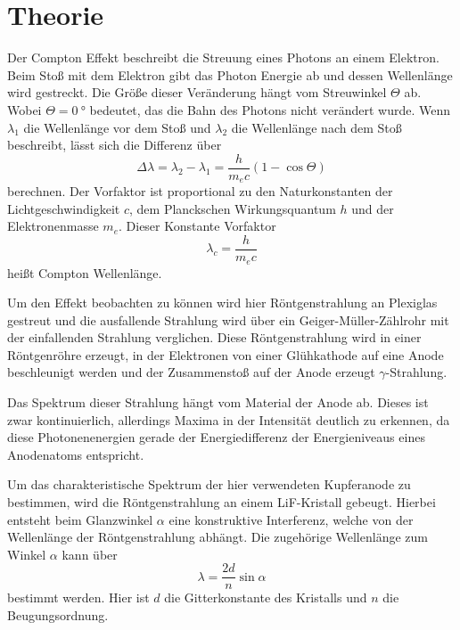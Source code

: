 \section{Theorie}
\label{sec:Theorie}




Der Compton Effekt beschreibt die Streuung eines Photons an einem Elektron.
Beim Stoß mit dem Elektron gibt das Photon Energie ab und dessen Wellenlänge wird gestreckt.
Die Größe dieser Veränderung hängt vom Streuwinkel $\Theta$ ab. 
Wobei $\Theta=\SI{0}{\degree}$ bedeutet, das die Bahn des Photons nicht verändert wurde.
Wenn $\lambda_1$ die Wellenlänge vor dem Stoß und $\lambda_2$ die Wellenlänge nach dem Stoß beschreibt, lässt sich die Differenz über
\begin{equation}
    \Delta \lambda = \lambda_2 - \lambda_1 = \frac{h}{m_e c}(1-\cos \Theta)
    \label{eq:differenz}
\end{equation}
berechnen.
Der Vorfaktor ist proportional zu den Naturkonstanten der Lichtgeschwindigkeit $c$, dem Planckschen Wirkungsquantum $h$ und der Elektronenmasse $m_e$.
Dieser Konstante Vorfaktor 
\begin{equation}
    \lambda_c = \frac{h}{m_e c}
    \label{eq:compton-wellenlänge}
\end{equation}
heißt Compton Wellenlänge.

Um den Effekt beobachten zu können wird hier Röntgenstrahlung an Plexiglas gestreut und die ausfallende Strahlung wird über ein Geiger-Müller-Zählrohr mit der einfallenden Strahlung verglichen.
Diese Röntgenstrahlung wird in einer Röntgenröhre erzeugt, in der Elektronen von einer Glühkathode auf eine Anode beschleunigt werden und der Zusammenstoß auf der Anode erzeugt $\gamma$-Strahlung.

Das Spektrum dieser Strahlung hängt vom Material der Anode ab.
Dieses ist zwar kontinuierlich, allerdings Maxima in der Intensität deutlich zu erkennen, da diese Photonenenergien gerade der Energiedifferenz der Energieniveaus eines Anodenatoms entspricht.

Um das charakteristische Spektrum der hier verwendeten Kupferanode zu bestimmen, wird die Röntgenstrahlung an einem LiF-Kristall gebeugt.
Hierbei entsteht beim Glanzwinkel $\alpha$ eine konstruktive Interferenz, welche von der Wellenlänge der Röntgenstrahlung abhängt. 
Die zugehörige Wellenlänge zum Winkel $\alpha$ kann über 
\begin{equation}
    \lambda = \frac{2d}{n}\sin\alpha
    \label{eq:glanzwinkel}
\end{equation}
bestimmt werden. 
Hier ist $d$ die Gitterkonstante des Kristalls und $n$ die Beugungsordnung.